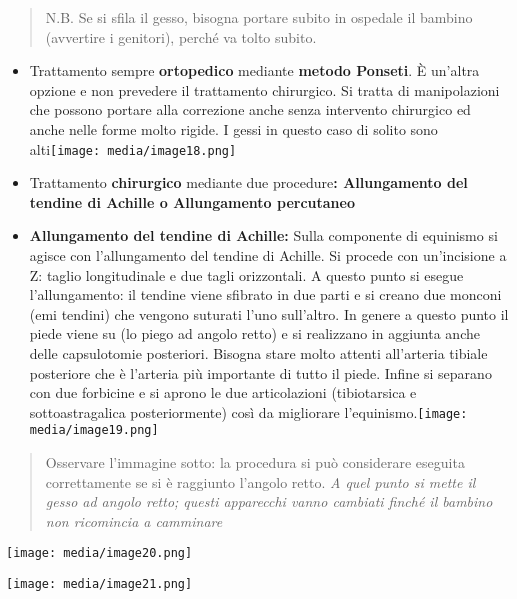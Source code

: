 \documentclass[]{article}
\begin{document}
\begin{quote}
N.B. Se si sfila il gesso, bisogna portare subito in ospedale il bambino
(avvertire i genitori), perché va tolto subito.
\end{quote}

\begin{itemize}
\item
  Trattamento sempre \textbf{ortopedico} mediante \textbf{metodo
  Ponseti}. È un'altra opzione e non prevedere il trattamento
  chirurgico. Si tratta di manipolazioni che possono portare alla
  correzione anche senza intervento chirurgico ed anche nelle forme
  molto rigide. I gessi in questo caso di solito sono
  alti\texttt{[image: media/image18.png]}
\item
  Trattamento \textbf{chirurgico} mediante due procedure\textbf{:
  Allungamento del tendine di Achille o Allungamento percutaneo}
\end{itemize}

\begin{itemize}
\item
  \textbf{Allungamento del tendine di Achille:} Sulla componente di
  equinismo si agisce con l'allungamento del tendine di Achille. Si
  procede con un'incisione a Z: taglio longitudinale e due tagli
  orizzontali. A questo punto si esegue l'allungamento: il tendine viene
  sfibrato in due parti e si creano due monconi (emi tendini) che
  vengono suturati l'uno sull'altro. In genere a questo punto il piede
  viene su (lo piego ad angolo retto) e si realizzano in aggiunta anche
  delle capsulotomie posteriori. Bisogna stare molto attenti all'arteria
  tibiale posteriore che è l'arteria più importante di tutto il piede.
  Infine si separano con due forbicine e si aprono le due articolazioni
  (tibiotarsica e sottoastragalica posteriormente) così da migliorare
  l'equinismo.\texttt{[image: media/image19.png]}
\end{itemize}

\begin{quote}
Osservare l'immagine sotto: la procedura si può considerare eseguita
correttamente se si è raggiunto l'angolo retto. \emph{A quel punto si
mette il gesso ad angolo retto; questi apparecchi vanno cambiati finché
il bambino non ricomincia a camminare}
\end{quote}

\texttt{[image: media/image20.png]}

\texttt{[image: media/image21.png]}
\end{document}
